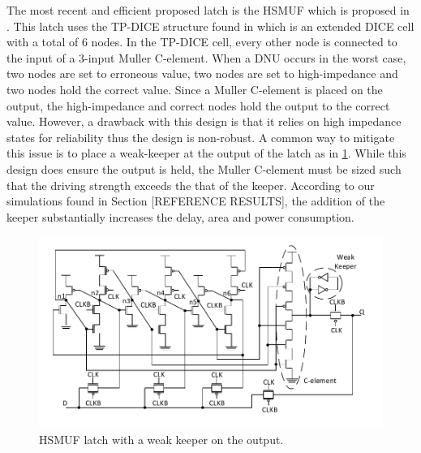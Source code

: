 The most recent and efficient proposed latch is the HSMUF which is proposed in \cite{HSMUF}. This latch uses the TP-DICE structure found in \cite{TPDICE} which is an extended DICE cell with a total of 6 nodes. In the TP-DICE cell, every other node is connected to the input of a 3-input Muller C-element. When a DNU occurs in the worst case, two nodes are set to erroneous value, two nodes are set to high-impedance and two nodes hold the correct value. Since a Muller C-element is placed on the output, the high-impedance and correct nodes hold the output to the correct value. However, a drawback with this design is that it relies on high impedance states for reliability thus the design is non-robust. A common way to mitigate this issue is to place a weak-keeper at the output of the latch as in \ref{HSMUF_fig}. While this design does ensure the output is held, the Muller C-element must be sized such that the driving strength exceeds the that of the keeper. According to our simulations found in Section [REFERENCE RESULTS], the addition of the keeper substantially increases the delay, area and power consumption. 

\begin{figure}[!htbp]
\centering
\includegraphics[width=\linewidth]{Figures/HSMUF}
\caption{HSMUF latch \cite{HSMUF} with a weak keeper on the output.}
\label{HSMUF_fig}
\end{figure}
 
